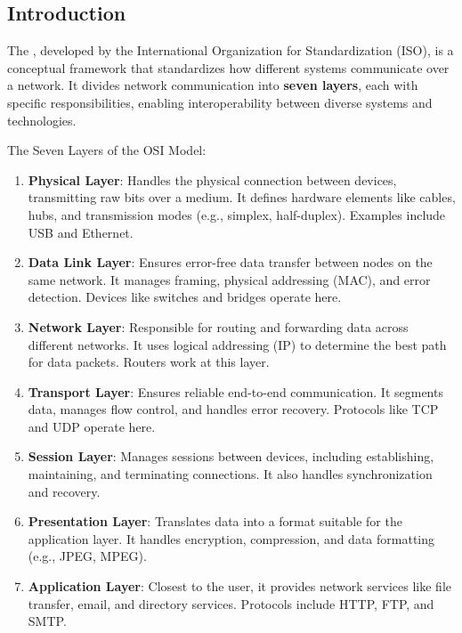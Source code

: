 \subsection{Introduction}\label{sec:datacenter-layer-3-load-balancing-introduction}

\begin{remarkbox}\label{rmk:osi-model}
    The , developed by the International Organization for Standardization (ISO), is a conceptual framework that standardizes how different systems communicate over a network. It divides network communication into \textbf{seven layers}, each with specific responsibilities, enabling interoperability between diverse systems and technologies.

    \highspace
    The Seven Layers of the OSI Model:
    \begin{enumerate}
        \item \textbf{Physical Layer}: Handles the physical connection between devices, transmitting raw bits over a medium. It defines hardware elements like cables, hubs, and transmission modes (e.g., simplex, half-duplex). Examples include USB and Ethernet.

        \item \textbf{Data Link Layer}: Ensures error-free data transfer between nodes on the same network. It manages framing, physical addressing (MAC), and error detection. Devices like switches and bridges operate here.

        \item \textbf{Network Layer}: Responsible for routing and forwarding data across different networks. It uses logical addressing (IP) to determine the best path for data packets. Routers work at this layer.

        \item \textbf{Transport Layer}: Ensures reliable end-to-end communication. It segments data, manages flow control, and handles error recovery. Protocols like TCP and UDP operate here.

        \item \textbf{Session Layer}: Manages sessions between devices, including establishing, maintaining, and terminating connections. It also handles synchronization and recovery.

        \item \textbf{Presentation Layer}: Translates data into a format suitable for the application layer. It handles encryption, compression, and data formatting (e.g., JPEG, MPEG).

        \item \textbf{Application Layer}: Closest to the user, it provides network services like file transfer, email, and directory services. Protocols include HTTP, FTP, and SMTP.
    \end{enumerate}
\end{remarkbox}

